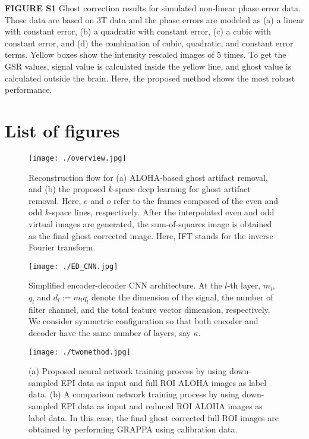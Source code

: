 \documentclass[num-refs]{wiley-article}
\newcommand{\0}{{\boldsymbol{0}}}
\newcommand{\1}{\blmath{1}}
\begin{document}
	\textbf{FIGURE S1}   Ghost correction results for simulated non-linear phase error data. Those data are based on 3T data and 
	the phase errors are modeled as (a) a linear with constant error, (b) a quadratic with constant error, (c) a cubic with constant error, and (d) the combination of cubic, quadratic, and constant error terms. Yellow boxes show the intensity rescaled images of 5 times.  To get the GSR values, signal value is calculated inside the yellow line, and ghost value is calculated outside the brain. Here, the proposed method shows the most robust performance.
	\clearpage
	
	
	\section*{List of figures}
	\begin{figure}[h]
		\centering
		\texttt{[image: ./overview.jpg]}
		\caption{
			Reconstruction flow for (a) ALOHA-based ghost artifact removal, and (b) the proposed $k$-space deep learning for ghost artifact removal. Here, $e$ and $o$ refer to the frames composed of the even and odd $k$-space lines, respectively. After the interpolated even and odd virtual images are generated, the sum-of-squares image is obtained as the final ghost corrected image. Here, IFT stands for the inverse Fourier transform. }
		\label{fig:overview}
	\end{figure}
	
	\begin{figure}[h]
		\centering
		\texttt{[image: ./ED\_CNN.jpg]}
		\caption{
			Simplified encoder-decoder CNN architecture. At the $l$-th layer, $m_l$, $q_l$ and $d_l:=m_lq_l$ denote the dimension of the signal,  the number of filter channel, and the	total feature vector dimension, respectively. We consider symmetric configuration  so that both encoder and decoder have the same number of layers, say $\kappa$.
		}
		\label{fig:geometry}
	\end{figure}
	
	\begin{figure}[h]
		\centering
		\texttt{[image: ./twomethod.jpg]}
		\caption{
			(a) Proposed neural network training process by using down-sampled EPI data as input and full ROI ALOHA images as label data. (b) A comparison network training process by using down-sampled EPI data as input and reduced ROI ALOHA images as label data. In this case, the final ghost corrected full ROI images are obtained by performing GRAPPA using calibration data.}
		\label{fig:twomethod}
	\end{figure}
	
\end{document}
